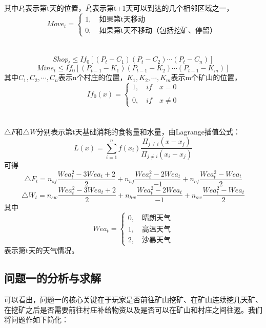 \documentclass[withoutpre]{cumcmthesis} %
\begin{document}
其中$P_t$表示第t天的位置，$\bar{P_t}$表示第t+1天可以到达的几个相邻区域之一，
$$Move_t=\begin{cases}
1,\quad \text{如果第t天移动}\\
0,\quad \text{如果第t天不移动（包括挖矿、停留）}
\end{cases}$$\\\\
\begin{equation}
Shop_t\leqslant If_0[(P_t-C_1)(P_t-C_2)\cdots(P_t-C_n)]
\end{equation}
\begin{equation}
Mine_t\leqslant If_0[(P_{t-1}-K_1)(P_{t-1}-K_2)\cdots(P_{t-1}-K_m)]
\end{equation}其中$C_1,C_2,\cdots,C_n$表示n个村庄的位置，$K_1,K_2,\cdots,K_m$表示m个矿山的位置，
$$If_0(x)=\begin{cases}
1,\quad if\quad x=0\\\\
0,\quad if\quad x\neq0
\end{cases}$$\\\\

$\triangle F$和$\triangle W$分别表示第t天基础消耗的食物量和水量，由Lagrange插值公式：
$$L(x)=\sum_{i=1}^nf(x_i)\displaystyle\frac{\Pi_{j\neq i}(x-x_j)}{\Pi_{j\neq i}(x_i-x_j)}$$
可得
\begin{equation}
\triangle F_t=n_{sf}\frac{Wea_t^2-3Wea_t+2}{2}+n_{hf}\frac{Wea_t^2-2Wea_t}{-1}+n_{of}\frac{Wea_t^2-Wea_t}{2}
\end{equation}
\begin{equation}
\triangle W_t=n_{sw}\frac{Wea_t^2-3Wea_t+2}{2}+n_{hw}\frac{Wea_t^2-2Wea_t}{-1}+n_{ow}\frac{Wea_t^2-Wea_t}{2}
\end{equation}
其中$$Wea_t=\begin{cases}
0,\quad\text{晴朗天气}\\
1,\quad\text{高温天气}\\
2,\quad\text{沙暴天气}
\end{cases}$$表示第t天的天气情况。



\subsection{问题一的分析与求解}
可以看出，问题一的核心关键在于玩家是否前往矿山挖矿、在矿山连续挖几天矿、在挖矿之后是否需要前往村庄补给物资以及是否可以在矿山和村庄之间往返。我们将问题作如下简化：
\end{document}
